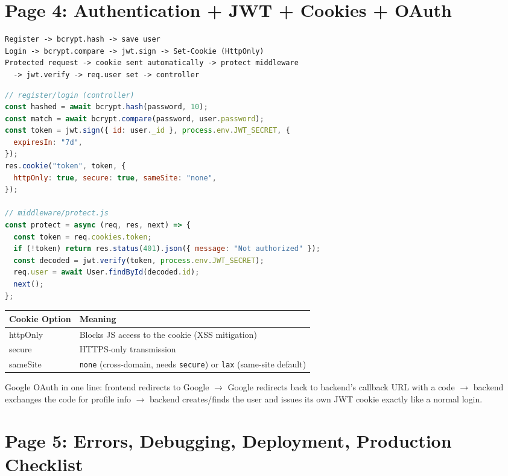 \newpage
\section*{Page 4: Authentication + JWT + Cookies + OAuth}

\begin{diagrambox}
\begin{verbatim}
Register -> bcrypt.hash -> save user
Login -> bcrypt.compare -> jwt.sign -> Set-Cookie (HttpOnly)
Protected request -> cookie sent automatically -> protect middleware
  -> jwt.verify -> req.user set -> controller
\end{verbatim}
\end{diagrambox}

\begin{lstlisting}[language=JavaScript]
// register/login (controller)
const hashed = await bcrypt.hash(password, 10);
const match = await bcrypt.compare(password, user.password);
const token = jwt.sign({ id: user._id }, process.env.JWT_SECRET, {
  expiresIn: "7d",
});
res.cookie("token", token, {
  httpOnly: true, secure: true, sameSite: "none",
});

// middleware/protect.js
const protect = async (req, res, next) => {
  const token = req.cookies.token;
  if (!token) return res.status(401).json({ message: "Not authorized" });
  const decoded = jwt.verify(token, process.env.JWT_SECRET);
  req.user = await User.findById(decoded.id);
  next();
};
\end{lstlisting}

\begin{tabularx}{\textwidth}{@{}>{\ttfamily}p{3cm}X@{}}
\toprule
Cookie Option & Meaning \\
\midrule
httpOnly & Blocks JS access to the cookie (XSS mitigation) \\
secure & HTTPS-only transmission \\
sameSite & \texttt{none} (cross-domain, needs \texttt{secure}) or
\texttt{lax} (same-site default) \\
\bottomrule
\end{tabularx}

Google OAuth in one line: frontend redirects to Google $\to$ Google
redirects back to backend's callback URL with a code $\to$ backend
exchanges the code for profile info $\to$ backend creates/finds the user
and issues its own JWT cookie exactly like a normal login.

\newpage
\section*{Page 5: Errors, Debugging, Deployment, Production Checklist}


